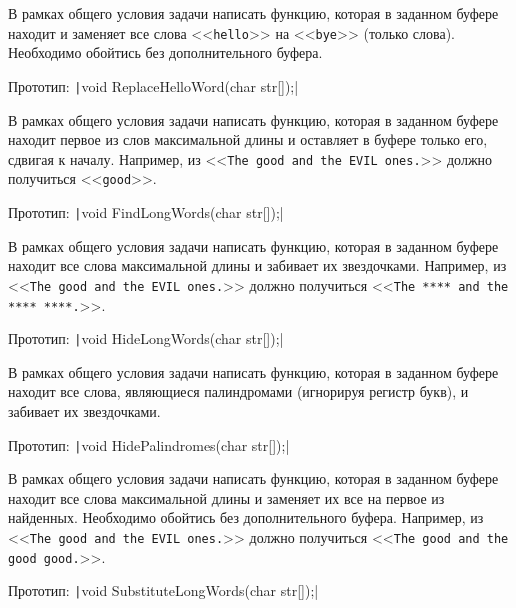 \begin{zztask}
В рамках общего условия задачи написать функцию, которая в заданном буфере
находит и заменяет все слова <<\texttt{hello}>> на <<\texttt{bye}>> (только слова).
Необходимо обойтись без дополнительного буфера.

Прототип: \texttt|void ReplaceHelloWord(char str[]);|
\end{zztask}


\begin{zztask}
В рамках общего условия задачи написать функцию, которая в заданном буфере
находит первое из слов максимальной длины и оставляет в буфере только его,
сдвигая к началу.
Например, из
<<\texttt{The good and the EVIL ones.}>>
должно получиться
<<\texttt{good}>>.

Прототип: \texttt|void FindLongWords(char str[]);|
\end{zztask}


\begin{zztask}
В рамках общего условия задачи написать функцию, которая в заданном буфере
находит все слова максимальной длины и забивает их звездочками.
Например, из
<<\texttt{The good and the EVIL ones.}>>
должно получиться
<<\texttt{The **** and the **** ****.}>>.

Прототип: \texttt|void HideLongWords(char str[]);|
\end{zztask}


\begin{zztask}
В рамках общего условия задачи написать функцию, которая в заданном буфере
находит все слова, являющиеся палиндромами (игнорируя регистр букв), и
забивает их звездочками.

Прототип: \texttt|void HidePalindromes(char str[]);|
\end{zztask}


\begin{zztask}
В рамках общего условия задачи написать функцию, которая в заданном буфере
находит все слова максимальной длины и заменяет их все на первое из
найденных.
Необходимо обойтись без дополнительного буфера.
Например, из
<<\texttt{The good and the EVIL ones.}>>
должно получиться
<<\texttt{The good and the good good.}>>.

Прототип: \texttt|void SubstituteLongWords(char str[]);|
\end{zztask}


